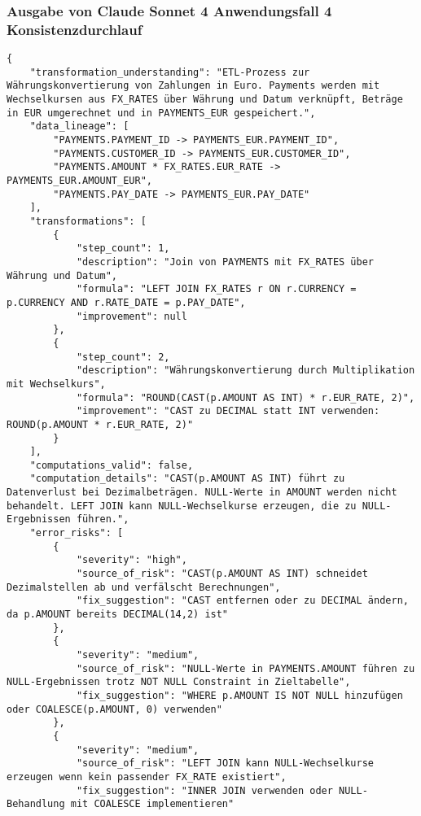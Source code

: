 \subsubsection{Ausgabe von Claude Sonnet 4 Anwendungsfall 4 Konsistenzdurchlauf}\label{anhang:subsubsec:claude_case4_prompt2}
\begin{lstlisting}[caption={Ausgabe: Claude Sonnet 4 Anwendungsfall 4 Konsistenzdurchlauf},label={claude_case4_prompt2}]
{
    "transformation_understanding": "ETL-Prozess zur Währungskonvertierung von Zahlungen in Euro. Payments werden mit Wechselkursen aus FX_RATES über Währung und Datum verknüpft, Beträge in EUR umgerechnet und in PAYMENTS_EUR gespeichert.",
    "data_lineage": [
        "PAYMENTS.PAYMENT_ID -> PAYMENTS_EUR.PAYMENT_ID",
        "PAYMENTS.CUSTOMER_ID -> PAYMENTS_EUR.CUSTOMER_ID",
        "PAYMENTS.AMOUNT * FX_RATES.EUR_RATE -> PAYMENTS_EUR.AMOUNT_EUR",
        "PAYMENTS.PAY_DATE -> PAYMENTS_EUR.PAY_DATE"
    ],
    "transformations": [
        {
            "step_count": 1,
            "description": "Join von PAYMENTS mit FX_RATES über Währung und Datum",
            "formula": "LEFT JOIN FX_RATES r ON r.CURRENCY = p.CURRENCY AND r.RATE_DATE = p.PAY_DATE",
            "improvement": null
        },
        {
            "step_count": 2,
            "description": "Währungskonvertierung durch Multiplikation mit Wechselkurs",
            "formula": "ROUND(CAST(p.AMOUNT AS INT) * r.EUR_RATE, 2)",
            "improvement": "CAST zu DECIMAL statt INT verwenden: ROUND(p.AMOUNT * r.EUR_RATE, 2)"
        }
    ],
    "computations_valid": false,
    "computation_details": "CAST(p.AMOUNT AS INT) führt zu Datenverlust bei Dezimalbeträgen. NULL-Werte in AMOUNT werden nicht behandelt. LEFT JOIN kann NULL-Wechselkurse erzeugen, die zu NULL-Ergebnissen führen.",
    "error_risks": [
        {
            "severity": "high",
            "source_of_risk": "CAST(p.AMOUNT AS INT) schneidet Dezimalstellen ab und verfälscht Berechnungen",
            "fix_suggestion": "CAST entfernen oder zu DECIMAL ändern, da p.AMOUNT bereits DECIMAL(14,2) ist"
        },
        {
            "severity": "medium",
            "source_of_risk": "NULL-Werte in PAYMENTS.AMOUNT führen zu NULL-Ergebnissen trotz NOT NULL Constraint in Zieltabelle",
            "fix_suggestion": "WHERE p.AMOUNT IS NOT NULL hinzufügen oder COALESCE(p.AMOUNT, 0) verwenden"
        },
        {
            "severity": "medium",
            "source_of_risk": "LEFT JOIN kann NULL-Wechselkurse erzeugen wenn kein passender FX_RATE existiert",
            "fix_suggestion": "INNER JOIN verwenden oder NULL-Behandlung mit COALESCE implementieren"

\end{lstlisting}
